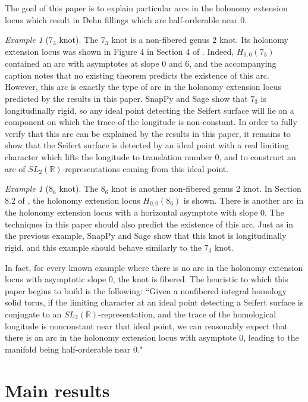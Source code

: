\documentclass{article}
\theoremstyle{plain}
\theoremstyle{definition}
\theoremstyle{plain}
\theoremstyle{plain}
\theoremstyle{plain}
\theoremstyle{remark}
\theoremstyle{remark}
\newtheorem{example}[theorem]{Example}
\theoremstyle{plain}
\theoremstyle{plain}
\begin{document}
The goal of this paper is to explain particular arcs in the holonomy extension locus which result in Dehn fillings which are half-orderable near 0. 

\begin{example}[$7_3$ knot]
The $7_3$ knot is a non-fibered genus 2 knot. Its holonomy extension locus was shown in Figure 4 in Section 4 of \cite{gao}. Indeed, $H_{0, 0}(7_3)$ contained an arc with asymptotes at slope 0 and 6, and the accompanying caption notes that no existing theorem predicts the existence of this arc. However, this arc is exactly the type of arc in the holonomy extension locus predicted by the results in this paper. SnapPy and Sage show that $7_3$ is longitudinally rigid, so any ideal point detecting the Seifert surface will lie on a component on which the trace of the longitude is non-constant. In order to fully verify that this arc can be explained by the results in this paper, it remains to show that the Seifert surface is detected by an ideal point with a real limiting character which lifts the longitude to translation number 0, and to construct an arc of $SL_2(\mathbb{R})$-representations coming from this ideal point. 
\end{example}

\begin{example}[$8_6$ knot]
The $8_6$ knot is another non-fibered genus 2 knot. In Section 8.2 of \cite{gaotwobridge}, the holonomy extension locus $H_{0, 0}(8_6)$ is shown. There is another arc in the holonomy extension locus with a horizontal asymptote with slope 0. The techniques in this paper should also predict the existence of this arc. Just as in the previous example, SnapPy and Sage show that this knot is longitudinally rigid, and this example should behave similarly to the $7_3$ knot.
\end{example}

In fact, for every known example where there is no arc in the holonomy extension locus with asymptotic slope 0, the knot is fibered. The heuristic to which this paper begins to build is the following: ``Given a nonfibered integral homology solid torus, if the limiting character at an ideal point detecting a Seifert surface is conjugate to an $SL_2(\mathbb{R})$-representation, and the trace of the homological longitude is nonconstant near that ideal point, we can reasonably expect that there is an arc in the holonomy extension locus with asymptote 0, leading to the manifold being half-orderable near 0."

\section{Main results}\label{sec:proof}
\end{document}
